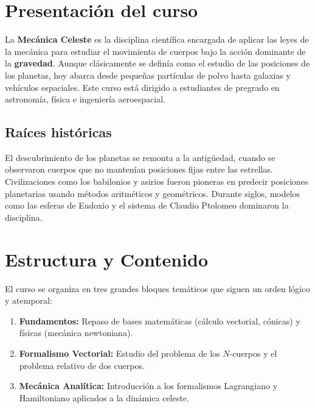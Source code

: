 \documentclass[a4paper]{article}
\begin{document}
\section{Presentación del curso}
La \textbf{Mecánica Celeste} es la disciplina científica encargada de aplicar las leyes de la mecánica para estudiar el movimiento de cuerpos bajo la acción dominante de la \textbf{gravedad}. Aunque clásicamente se definía como el estudio de las posiciones de los planetas, hoy abarca desde pequeñas partículas de polvo hasta galaxias y vehículos espaciales. Este curso está dirigido a estudiantes de pregrado en astronomía, física e ingeniería aeroespacial.

\subsection{Raíces históricas}
El descubrimiento de los planetas se remonta a la antigüedad, cuando se observaron cuerpos que no mantenían posiciones fijas entre las estrellas. Civilizaciones como los babilonios y asirios fueron pioneras en predecir posiciones planetarias usando métodos aritméticos y geométricos. Durante siglos, modelos como las esferas de Eudoxio y el sistema de Claudio Ptolomeo dominaron la disciplina.

\section{Estructura y Contenido}
El curso se organiza en tres grandes bloques temáticos que siguen un orden lógico y atemporal:
\begin{enumerate}
    \item \textbf{Fundamentos:} Repaso de bases matemáticas (cálculo vectorial, cónicas) y físicas (mecánica newtoniana).
    \item \textbf{Formalismo Vectorial:} Estudio del problema de los $N$-cuerpos y el problema relativo de dos cuerpos.
    \item \textbf{Mecánica Analítica:} Introducción a los formalismos Lagrangiano y Hamiltoniano aplicados a la dinámica celeste.
\end{enumerate}
\end{document}

